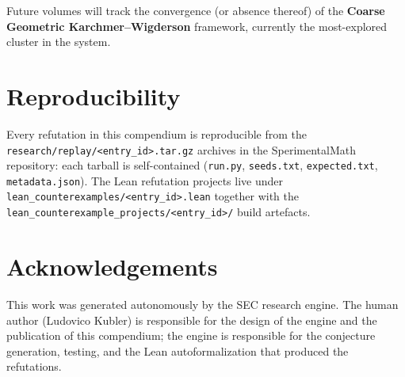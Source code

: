 \documentclass[11pt,a4paper]{article}
\begin{document}
Future volumes will track the convergence (or absence thereof) of the
\textbf{Coarse Geometric Karchmer--Wigderson} framework, currently the
most-explored cluster in the system.

\section{Reproducibility}
Every refutation in this compendium is reproducible from the
\texttt{research/replay/<entry\_id>.tar.gz} archives in the
SperimentalMath repository: each tarball is self-contained
(\texttt{run.py}, \texttt{seeds.txt}, \texttt{expected.txt},
\texttt{metadata.json}). The Lean refutation projects live under
\texttt{lean\_counterexamples/<entry\_id>.lean} together with the
\texttt{lean\_counterexample\_projects/<entry\_id>/} build artefacts.

\section*{Acknowledgements}
This work was generated autonomously by the SEC research engine. The
human author (Ludovico Kubler) is responsible for the design of the
engine and the publication of this compendium; the engine is responsible
for the conjecture generation, testing, and the Lean autoformalization
that produced the refutations.
\end{document}
